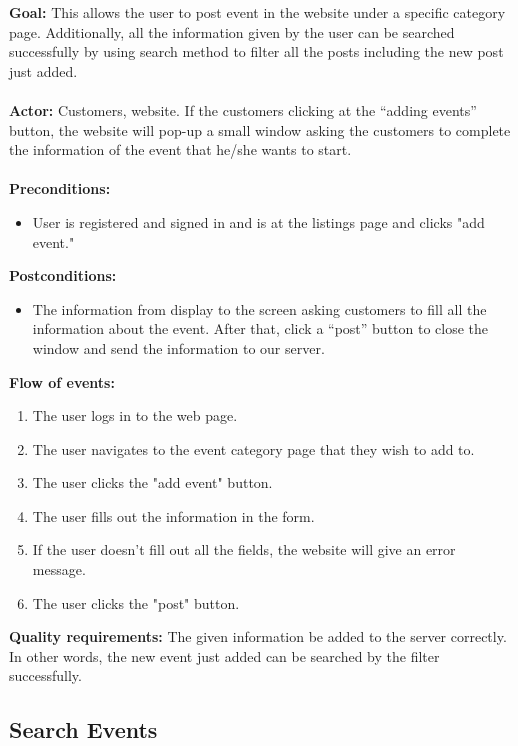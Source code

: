 \documentclass[a4paper]{article}
\begin{document}
\textbf{Goal:} 
This allows the user to post event in the website under a specific category page. Additionally, all the information given by the user can be searched successfully by using search method to filter all the posts including the new post just added.\\
\\
\textbf{Actor:} 
Customers, website. If the customers clicking at the “adding events” button, the website will pop-up a small window asking the customers to complete the information of the event that he/she wants to start.\\ 
\\
\textbf{Preconditions:} 
\begin{itemize}
\item User is registered and signed in and is at the listings page and clicks "add event."
\end{itemize}
\textbf{Postconditions:} 
\begin{itemize}
\item The information from display to the screen asking customers to fill all the information about the event. After that, click a “post” button to close the window and send the information to our server.\newpage
\end{itemize}
\textbf{Flow of events:} 
\begin{enumerate}
\item The user logs in to the web page.
\item The user navigates to the event category page that they wish to add to.
\item The user clicks the "add event" button.
\item The user fills out the information in the form.
\item If the user doesn't fill out all the fields, the website will give an error message.
\item The user clicks the "post" button.
\end{enumerate}
\textbf{Quality requirements:} 
The given information be added to the server correctly. In other words, the new event just added can be searched by the filter successfully. 

\subsection{Search Events}
\end{document}
